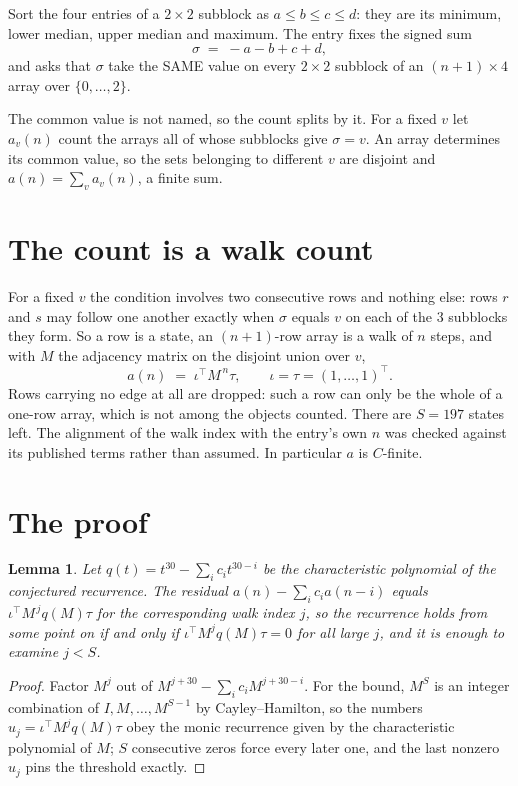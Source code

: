 \documentclass[11pt,a4paper]{article}
\theoremstyle{plain}
\newtheorem{lemma}[theorem]{Lemma}
\theoremstyle{definition}
\begin{document}
Sort the four entries of a $2\times2$ subblock as $a\le b\le c\le d$: they
are its minimum, lower median, upper median and maximum. The entry fixes the signed sum
\[
\sigma\;=\;-a-b+c+d,
\]
and asks that $\sigma$ take the SAME value on every $2\times2$ subblock of an
$(n+1)\times4$ array over $\{0,\dots,2\}$.

The common value is not named, so the count splits by it. For a fixed $v$ let $a_v(n)$ count
the arrays all of whose subblocks give $\sigma=v$. An array determines its common value, so
the sets belonging to different $v$ are disjoint and $a(n)=\sum_v a_v(n)$, a finite sum.


\section{The count is a walk count}

For a fixed $v$ the condition involves two consecutive rows and nothing
else: rows $r$ and $s$ may follow one another exactly when $\sigma$ equals $v$ on each of the
$3$ subblocks they form. So a row is a state, an $(n+1)$-row array is a walk of $n$
steps, and with $M$ the adjacency matrix on the disjoint union over $v$,
\[
a(n)\;=\;\iota^{\!\top}M^{\,n}\tau,\qquad\iota=\tau=(1,\dots,1)^{\!\top} .
\]
Rows carrying no edge at all are dropped: such a row can only be the whole of a one-row
array, which is not among the objects counted. There are $S=197$ states left.
The alignment of the walk index with the entry's own $n$ was checked against its published
terms rather than assumed. In particular $a$ is $C$-finite.

\section{The proof}

\begin{lemma}\label{lem:crit}
Let $q(t)=t^{30}-\sum_i c_it^{30-i}$ be the characteristic polynomial of the
conjectured recurrence. The residual $a(n)-\sum_ic_ia(n-i)$ equals
$\iota^{\!\top}M^{\,j}q(M)\tau$ for the corresponding walk index $j$, so the recurrence
holds from some point on if and only if $\iota^{\!\top}M^{j}q(M)\tau=0$ for all large $j$,
and it is enough to examine $j<S$.
\end{lemma}

\begin{proof}
Factor $M^{j}$ out of $M^{j+30}-\sum_ic_iM^{j+30-i}$. For the bound, $M^{S}$
is an integer combination of $I,M,\dots,M^{S-1}$ by Cayley--Hamilton, so the numbers
$u_j=\iota^{\!\top}M^{j}q(M)\tau$ obey the monic recurrence given by the characteristic
polynomial of $M$; $S$ consecutive zeros force every later one, and the last nonzero $u_j$
pins the threshold exactly.
\end{proof}
\end{document}
